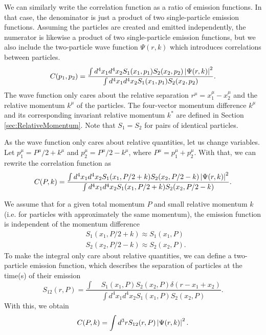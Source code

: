 We can similarly write the correlation function as a ratio of emission functions.
In that case, the denominator is just a product of two single-particle emission functions.
Assuming the particles are created and emitted independently, the numerator is likewise a product of two single-particle emission functions, but we also include the two-particle wave function $\Psi(r,k)$ which introduces correlations between particles.
\begin{equation}
\label{eq:BiggerKooninPratt}
C(p_1,p_2) = \frac{\int d^4x_1d^4x_2 S_1(x_1,p_1) S_2(x_2,p_2)\left\lvert\Psi(r,k)\right\rvert^2}{\int d^4x_1d^4x_2 S_1(x_1,p_1) S_2(x_2,p_2)}.
\end{equation}
The wave function only cares about the relative separation $r^\mu = x_1^\mu - x_2^\mu$ and the relative momentum $k^\mu$ of the particles. 
The four-vector momentum difference $k^\mu$ and its corresponding invariant relative momentum $k^*$ are defined in Section \ref{sec:RelativeMomentum}.
Note that $S_1 = S_2$ for pairs of identical particles.

As the wave function only cares about relative quantities, let us change variables.
Let $p_1^\mu = P^\mu/2 + k^\mu$ and $p_2^\mu = P^\mu/2 - k^\mu$, where $P^\mu = p_1^\mu + p_2^\mu$.
With that, we can rewrite the correlation function as 
\begin{equation}
\label{eq:KooninPrattWithPAndK}
C(P,k) = \frac{\int d^4x_1d^4x_2 S_1(x_1,P/2 + k) S_2(x_2,P/2 - k)\left\lvert\Psi(r,k)\right\rvert^2}{\int d^4x_1d^4x_2 S_1(x_1,P/2 + k) S_2(x_2,P/2 - k)}.
\end{equation}

We assume that for a given total momentum $P$ and small relative momentum $k$ (i.e. for particles with approximately the same momentum), the emission function is independent of the momentum difference
\begin{equation}
\begin{split}
& S_1(x_1,P/2+k) \approx S_1(x_1,P) \\ 
& S_2(x_2,P/2-k) \approx S_2(x_2,P).
\end{split}
\end{equation}
To make the integral only care about relative quantities, we can define a two-particle emission function, which describes the separation of particles at the time(s) of their emission
\begin{equation}
\label{eq:TwoParticleEmissionFunction}
S_{12}(r, P)=\frac{\int\mathop{d^4x_1}\mathop{d^4x_2}S_1(x_1,P) S_2(x_2,P)\delta(r - x_1 +x_2)}{\int d^4x_1d^4x_2 S_1(x_1,P) S_2(x_2,P)}.
\end{equation}
With this, we obtain
\begin{equation}
C(P,k) =  \int d^3r S_{12}(r, P) \left\lvert\Psi(r,k)\right\rvert^2.
\end{equation}

